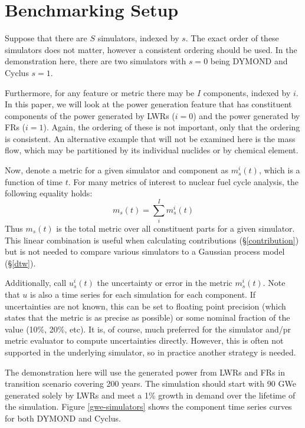 \section{Benchmarking Setup}
\label{setup}

Suppose that there are $S$ simulators, indexed by $s$. The exact order 
of these simulators does not matter, however a consistent ordering should
be used. In the demonstration here, there are two simulators with $s=0$
being DYMOND and Cyclus $s=1$.

Furthermore, for any feature or metric there may be $I$ components, 
indexed by $i$. In this paper, we will look at the power generation feature
that has constituent components of the power generated by LWRs ($i=0$) and
the power generated by FRs ($i=1$).  Again, the ordering of these is not 
important, only that the ordering is consistent. An alternative example
that will not be examined here is the mass flow, which may be partitioned 
by its individual nuclides or by chemical element.

Now, denote a metric for a given simulator and component as 
$m_s^i(t)$, which is a function of time $t$. For many metrics of interest 
to nuclear fuel cycle analysis, the following equality holds:
\begin{equation}
m_s(t) = \sum_i^I m_s^i(t)
\end{equation}
Thus $m_s(t)$ is the total metric over all constituent parts for a given 
simulator. This linear combination is useful when calculating contributions
(\S \ref{contribution}) but is not needed to compare various simulators
to a Gaussian process model (\S \ref{dtw}).

Additionally, call $u_s^i(t)$ the uncertainty or error in the metric 
$m_s^i(t)$. Note that $u$ is also a time series for each simulation for 
each component. If uncertainties are not known, this can be set to floating
point precision (which states that the metric is as precise as possible) or
some nominal fraction of the value (10\%, 20\%, etc). It is, of course, 
much preferred for the simulator and/pr metric evaluator to compute 
uncertainties directly. However, this is often not supported in the underlying
simulator, so in practice another strategy is needed.  

The demonstration here will use the generated power from LWRs and FRs in 
transition scenario covering 200 years. The simulation should start with
90 GWe generated solely by LWRs and meet a 1\% growth in demand over the 
lifetime of the simulation. Figure \ref{gwe-simulators} shows the component time 
series curves for both DYMOND and Cyclus.

